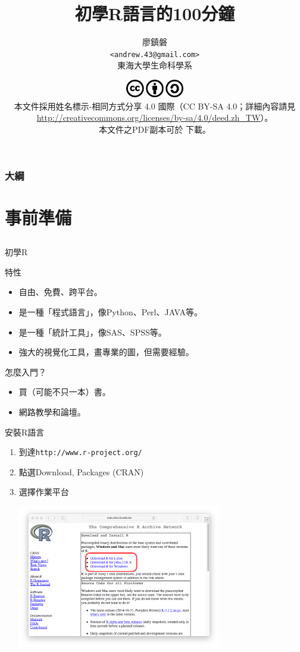 \documentclass[12pt]{beamer}
\title[初學者學習R語言]{初學R語言的100分鐘}
\author[廖鎮磐]{廖鎮磐 \\ \texttt{<andrew.43@gmail.com>}\\ 東海大學生命科學系}
\institute{\normalsize 2015年3月15日於蓮華池}
\date{\scriptsize \includegraphics[width=1in]{cc.pdf}\\[5pt]
本文件採用姓名標示-相同方式分享 4.0 國際（CC BY-SA 4.0；詳細內容請見 \url{http://creativecommons.org/licenses/by-sa/4.0/deed.zh_TW}）。\\ 本文件之PDF副本可於 \url{} 下載。}
\begin{document}
\begin{frame}
\titlepage
\end{frame}

\begin{frame}
\frametitle{大綱}
\tableofcontents
\end{frame}

\section{事前準備}\subsection{}

\begin{frame}{初學R}
\begin{block}{特性}
\begin{itemize}
\item 自由、免費、跨平台。
\item 是一種「程式語言」，像Python、Perl、JAVA等。
\item 是一種「統計工具」，像SAS、SPSS等。
\item 強大的視覺化工具，畫專業的圖，但需要經驗。
\end{itemize}
\end{block}
\begin{block}{怎麼入門？}
\begin{itemize}
\item 買（可能不只一本）書。
\item 網路教學和論壇。
\end{itemize}
\end{block}
\end{frame}

\begin{frame}[fragile]{安裝R語言}
\begin{enumerate}
\item 到達\texttt{http://www.r-project.org/}
\item 點選Download, Packages (CRAN) \\
\item 選擇作業平台
	\begin{center}\includegraphics[width=0.7\textwidth]{downloadR.png}\end{center}
\end{enumerate}
\end{frame}
\end{document}
